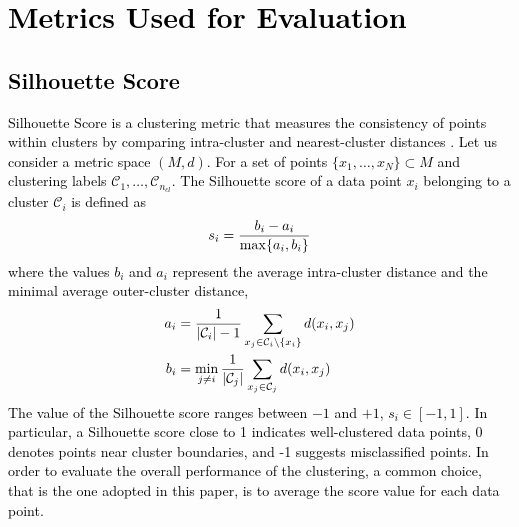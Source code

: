 \section{\textcolor{black}{Metrics Used for Evaluation}} \label{app:metrics_choice}
\subsection{\textcolor{black}{Silhouette Score}}
\textcolor{black}{Silhouette Score is a clustering metric that measures the consistency of points within clusters by comparing intra-cluster and nearest-cluster distances \citep{rousseeuw1987silhouettes}. Let us consider a metric space $(M,d)$. For a set of points $\{x_1,\dots, x_N\} \subset M$ and clustering labels $\mathcal{C}_1, \dots, \mathcal{C}_{n_{cl}}$. The Silhouette score of a data point $x_i$ belonging to a cluster $\mathcal{C}_i$ is defined as}
\begin{equation}\label{silhouette_defn1}
    \color{black}
    s_i = \dfrac{b_i - a_i}{\max\{a_i,b_i\}}
\end{equation}
\textcolor{black}{where the values $b_i$ and $a_i$ represent the average intra-cluster distance and the minimal average outer-cluster distance, \ie}\begin{equation}\label{silhouette_defn}
    \color{black}
    \begin{split}
        a_i &= \dfrac{1}{|\mathcal{C}_i| - 1} \sum_{x_j \in \mathcal{C}_i\setminus\{x_i\}} d(x_i, x_j)\\
        b_i & =\min_{j \neq i} \dfrac{1}{|\mathcal{C}_j|} \sum_{x_j \in \mathcal{C}_j} d(x_i,x_j)
    \end{split}
\end{equation}
\textcolor{black}{The value of the Silhouette score ranges between $-1$ and $+1$, \ie $s_i \in [-1,1]$. In particular, a Silhouette score close to 1 indicates well-clustered data points, 0 denotes points near cluster boundaries, and -1 suggests misclassified points. In order to evaluate the overall performance of the clustering, a common choice, that is the one adopted in this paper, is to average the score value for each data point.}
